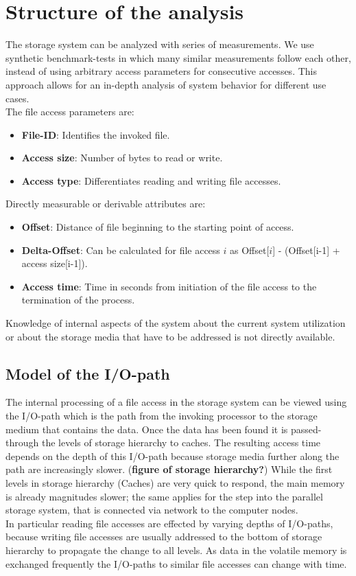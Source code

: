 \documentclass{superfri}
\begin{document}
\section{Structure of the analysis}
The storage system can be analyzed with series of measurements.
We use synthetic benchmark-tests in which many similar measurements follow each other, instead of using arbitrary access parameters for consecutive accesses.
This approach allows for an in-depth analysis of system behavior for different use cases.\\
The file access parameters are:
\begin{itemize}
	\item \textbf{File-ID}: Identifies the invoked file.
	\item \textbf{Access size}: Number of bytes to read or write.
	\item \textbf{Access type}: Differentiates reading and writing file accesses.
\end{itemize}
Directly measurable or derivable attributes are:
\begin{itemize}
	\item \textbf{Offset}: Distance of file beginning to the starting point of access.
	\item \textbf{Delta-Offset}: Can be calculated for file access $i$ as Offset[$i$] - (Offset[i-1] + access size[i-1]).
	\item \textbf{Access time}: Time in seconds from initiation of the file access to the termination of the process.
\end{itemize}
Knowledge of internal aspects of the system about the current system utilization or about the storage media that have to be addressed is not directly available.

\subsection{Model of the I/O-path}
The internal processing of a file access in the storage system can be viewed using the I/O-path which is the path from the invoking processor to the storage medium that contains the data. Once the data has been found it is passed-through the levels of storage hierarchy to caches.
The resulting access time depends on the depth of this I/O-path because storage media further along the path are increasingly slower.
(\textbf{figure of storage hierarchy?})
While the first levels in storage hierarchy (Caches) are very quick to respond, the main memory is already magnitudes slower; the same applies for the step into the parallel storage system, that is connected via network to the computer nodes.\\
In particular reading file accesses are effected by varying depths of I/O-paths, because writing file accesses are usually addressed to the bottom of storage hierarchy to propagate the change to all levels.
As data in the volatile memory is exchanged frequently the I/O-paths to similar file accesses can change with time.
\end{document}
